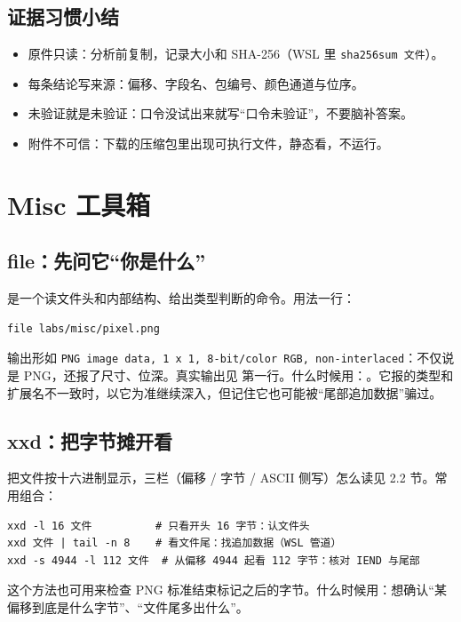 \documentclass[UTF8,12pt,oneside]{ctexbook}
\begin{document}
\section{证据习惯小结}
\begin{itemize}
\item 原件只读：分析前复制，记录大小和 SHA-256（WSL 里 \verb|sha256sum 文件|）。
\item 每条结论写来源：偏移、字段名、包编号、颜色通道与位序。
\item 未验证就是未验证：口令没试出来就写“口令未验证”，不要脑补答案。
\item 附件不可信：下载的压缩包里出现可执行文件，静态看，不运行。
\end{itemize}

\chapter{Misc 工具箱}
\label{chap:tools}

\section{file：先问它“你是什么”}
 是一个读文件头和内部结构、给出类型判断的命令。用法一行：
\begin{lstlisting}
file labs/misc/pixel.png
\end{lstlisting}
输出形如 \verb|PNG image data, 1 x 1, 8-bit/color RGB, non-interlaced|：不仅说是 PNG，还报了尺寸、位深。真实输出见 第一行。什么时候用：。它报的类型和扩展名不一致时，以它为准继续深入，但记住它也可能被“尾部追加数据”骗过。

\section{xxd：把字节摊开看}
 把文件按十六进制显示，三栏（偏移 / 字节 / ASCII 侧写）怎么读见 2.2 节。常用组合：
\begin{lstlisting}
xxd -l 16 文件          # 只看开头 16 字节：认文件头
xxd 文件 | tail -n 8    # 看文件尾：找追加数据（WSL 管道）
xxd -s 4944 -l 112 文件  # 从偏移 4944 起看 112 字节：核对 IEND 与尾部
\end{lstlisting}
这个方法也可用来检查 PNG 标准结束标记之后的字节。什么时候用：想确认“某偏移到底是什么字节”、“文件尾多出什么”。
\end{document}
